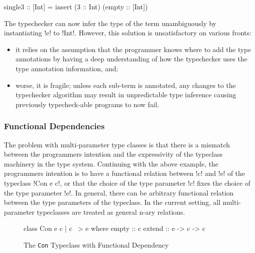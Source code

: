 \documentclass[screen,nonacm]{acmart}
\begin{document}
\begin{CenteredBox}
\begin{code}
single3 :: [Int] = insert (3 :: Int) (empty :: [Int])
\end{code}
\end{CenteredBox}

The typechecker can now infer the type of the term unambiguously by
instantiating !e! to !Int!. However, this solution is unsatisfactory
on various fronts:
\begin{itemize}
\item it relies on the assumption that the programmer knows where to add the
  type annotations by having a deep understanding of how the typechecker
  uses the type annotation information, and;
\item worse, it is fragile;
  unless each sub-term is annotated, any changes to the typechecker
  algorithm may result in unpredictable type inference causing
  previously typecheck-able programs to now fail.
\end{itemize}

\subsubsection{Functional Dependencies}
The problem with multi-parameter type classes is that there is a
mismatch between the programmers intention and the expressivity of the
typeclass machinery in the type system. Continuing with the above example, the
programmers intention is to have a functional relation between !c! and
!e! of the typeclass !Con e c!, or that the choice of the type
parameter !c! fixes the choice of the type parameter !e!. In general,
there can be arbitrary functional relation between the type parameters
of the typeclass. In the current setting, all multi-parameter
typeclasses are treated as general n-ary relations.

\begin{figure}[ht]
\begin{CenteredBox}
\begin{code}
class Con e c | c ~> e where
  empty :: c
  extend :: e -> c -> c
\end{code}
\end{CenteredBox}
\caption[\lstinline{Con} typeclass]{The \lstinline{Con} Typeclass with Functional Dependency}
\label{fig:tc-collection-fd}
\end{figure}
\end{document}
